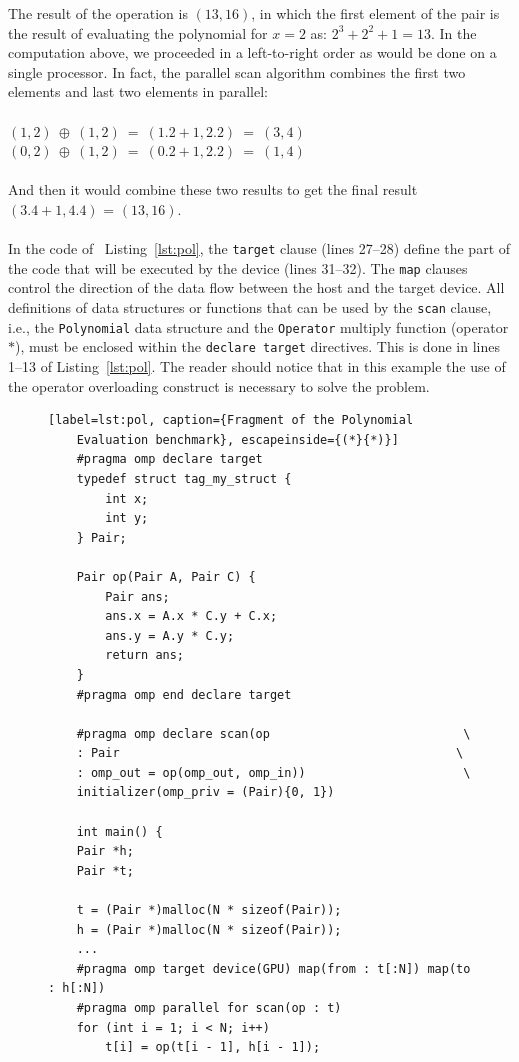 \documentclass[Ingles]{ic-tese-v1}
\newcommand{\ttt}[1]{{\texttt{#1}}}
\newcommand{\rlst}[1]{Listing~\ref{lst:#1}}
\begin{document}
The result of the operation is $(13, 16)$, in which the first element of the pair  is the result  of
evaluating the polynomial for $x = 2$  as: $2^{3} + 2^{2} + 1 = 13$.
In the computation above, we proceeded in a left-to-right order as would be
done on a single processor. In fact, the parallel scan algorithm
combines the first two elements and last two elements in parallel:\\\\
$(1, 2) \:\oplus\: (1, 2) \:=\: (1 . 2 + 1, 2 . 2) \:=\: (3, 4)$\\
$(0, 2) \:\oplus\: (1, 2) \:=\: (0 . 2 + 1, 2 . 2) \:=\: (1, 4)$\\\\
And then it would combine these two results to get the final result $(3 . 4 + 1, 4 . 4)$
= $(13, 16)$.
\\\\
In the code of ~\rlst{pol}, the \ttt{target} clause (lines 27--28) define the part of the code
that will  be  executed by  the device  (lines 31--32).  The \ttt{map} clauses control the direction  of the data flow
between the host and the target device. All definitions of data structures
or functions  that can be used  by the \ttt{scan} clause,  i.e., the
\ttt{Polynomial} data  structure and the \ttt{Operator}  multiply function
(operator$*$),  must   be  enclosed  within  the   \ttt{declare  target}
directives. This is done in lines 1--13 of \rlst{pol}.
The reader should notice that in this example the use of the operator overloading
construct is necessary to solve the problem.

\begin{figure}[t]
	\lstset{basicstyle=\scriptsize}
	\begin{lstlisting}[label=lst:pol, caption={Fragment of the Polynomial
	Evaluation benchmark}, escapeinside={(*}{*)}]
	#pragma omp declare target
	typedef struct tag_my_struct {
		int x;
		int y;
	} Pair;

	Pair op(Pair A, Pair C) {
		Pair ans;
		ans.x = A.x * C.y + C.x;
		ans.y = A.y * C.y;
		return ans;
	}
	#pragma omp end declare target

	#pragma omp declare scan(op                           \
	: Pair                                               \
	: omp_out = op(omp_out, omp_in))                      \
	initializer(omp_priv = (Pair){0, 1})

	int main() {
	Pair *h;
	Pair *t;

	t = (Pair *)malloc(N * sizeof(Pair));
	h = (Pair *)malloc(N * sizeof(Pair));
	...
	#pragma omp target device(GPU) map(from : t[:N]) map(to : h[:N])
	#pragma omp parallel for scan(op : t)
	for (int i = 1; i < N; i++)
		t[i] = op(t[i - 1], h[i - 1]);

	\end{lstlisting}
\end{figure}
\end{document}
